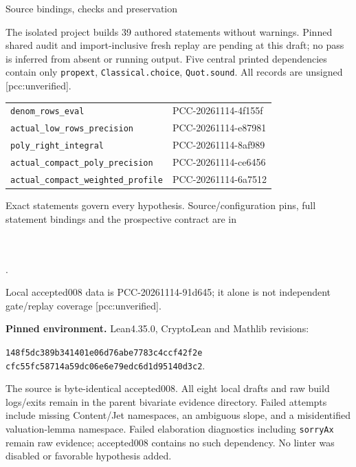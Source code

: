 \documentclass[10pt]{article}
\begin{document}
\newpage
\begin{center}{\Large Source bindings, checks and preservation}\end{center}
The isolated project builds 39 authored statements without warnings.
Pinned shared audit and import-inclusive fresh replay are pending at this
draft; no pass is inferred from absent or running output. Five central
printed dependencies contain only \texttt{propext}, \texttt{Classical.choice},
\texttt{Quot.sound}. All records are unsigned [pcc:unverified].

\begin{center}\small
\begin{tabular}{p{.63\linewidth}p{.26\linewidth}}
\texttt{denom\_rows\_eval}&PCC-20261114-4f155f\\
\texttt{actual\_low\_rows\_precision}&PCC-20261114-e87981\\
\texttt{poly\_right\_integral}&PCC-20261114-8af989\\
\texttt{actual\_compact\_poly\_precision}&PCC-20261114-ce6456\\
\texttt{actual\_compact\_weighted\_profile}&PCC-20261114-6a7512
\end{tabular}
\end{center}
Exact statements govern every hypothesis. Source/configuration pins, full
statement bindings and the prospective contract are in
\begin{center}\small
{}\\
\\
.
\end{center}
Local accepted008 data is PCC-20261114-91d645; it alone is not independent
gate/replay coverage [pcc:unverified].

\textbf{Pinned environment.} Lean4.35.0, CryptoLean and Mathlib revisions:
\begin{center}\small
\texttt{148f5dc389b341401e06d76abe7783c4ccf42f2e}\\
\texttt{cfc55fc58714a59dc06e6e79edc6d1d95140d3c2}.
\end{center}
The source is byte-identical accepted008. All eight local drafts and raw
build logs/exits remain in the parent bivariate evidence directory.
Failed attempts include missing Content/Jet namespaces, an ambiguous slope,
and a misidentified valuation-lemma namespace. Failed elaboration diagnostics
including \texttt{sorryAx} remain raw evidence; accepted008 contains no such
dependency. No linter was disabled or favorable hypothesis added.
\end{document}
